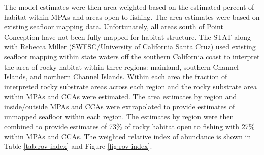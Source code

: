 \documentclass[11pt,
  english,
  letterpaper,
]{article}
\begin{document}
The model estimates were then area-weighted based on the estimated percent of habitat within MPAs and areas open to fishing. The area estimates were based on existing seafloor mapping data. Unfortunately, all areas south of Point Conception have not been fully mapped for habitat structure. The STAT along with Rebecca Miller (SWFSC/University of California Santa Cruz) used existing seafloor mapping within state waters off the southern California coast to interpret the area of rocky habitat within three regions: mainland, southern Channel Islands, and northern Channel Islands. Within each area the fraction of interpreted rocky substrate areas across each region and the rocky substrate area within MPAs and CCAs were estimated. The area estimates by region and inside/outside MPAs and CCAs were extrapolated to provide estimates of unmapped seafloor within each region. The estimates by region were then combined to provide estimates of 73\% of rocky habitat open to fishing with 27\% within MPAs and CCAs. The weighted relative index of abundance is shown in Table \ref{tab:rov-index} and Figure \ref{fig:rov-index}.

\newpage



\newpage

\begingroup\fontsize{7}{9}\selectfont
\end{document}
